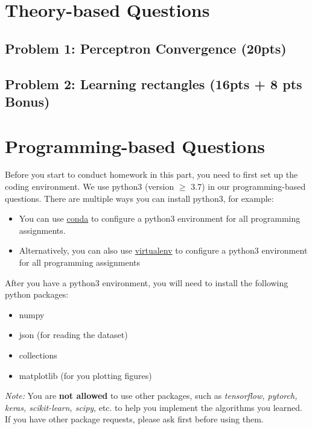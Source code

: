 \documentclass{article}
\newcommand{\blue}[1]{{\color{blue}#1}}
\newcommand{\pink}[1]{{\color{magenta}#1}}
\begin{document}
\section*{Theory-based Questions}
\subsection*{Problem 1: Perceptron Convergence (\blue{20pts})}
     


\subsection*{Problem 2: Learning rectangles (\blue{16pts + 8 pts Bonus})}


\clearpage

\section*{Programming-based Questions}


Before you start to conduct homework in this part, you need to first set up the coding environment. We use python3 (version $\geq$ 3.7) in our programming-based questions. There are multiple ways you can install python3, for example:
\begin{itemize}[topsep=5pt, itemsep=-2pt]
    \item You can use \href{https://docs.conda.io/en/latest/}{\pink{conda}} to configure a python3 environment for all programming assignments.
    \item Alternatively, you can also use \href{https://virtualenv.pypa.io/en/stable/}{\pink{virtualenv}} to configure a python3 environment for all programming assignments
\end{itemize}

After you have a python3 environment, you will need to install the following python packages:
\begin{itemize}[topsep=5pt, itemsep=-2pt]
    \item numpy
    \item json (for reading the dataset)
    \item collections
    \item matplotlib (for you plotting figures)
\end{itemize}

\emph{Note:} You are \textbf{not allowed} to use other packages, such as \emph{tensorflow, pytorch, keras, scikit-learn, scipy}, etc. to help you implement the algorithms you learned. If you have other package requests, please ask first before using them.\\
\end{document}
